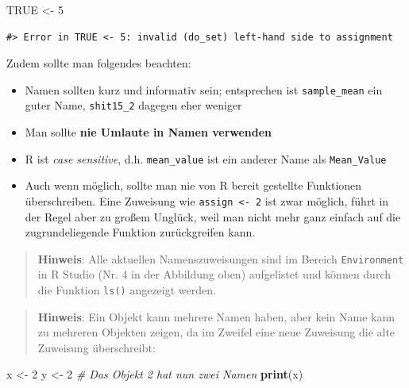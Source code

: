 \documentclass[]{tufte-book}
\newenvironment{Shaded}{}{}
\newcommand{\KeywordTok}[1]{\textcolor[rgb]{0.00,0.44,0.13}{\textbf{#1}}}
\newcommand{\DecValTok}[1]{\textcolor[rgb]{0.25,0.63,0.44}{#1}}
\newcommand{\StringTok}[1]{\textcolor[rgb]{0.25,0.44,0.63}{#1}}
\newcommand{\CommentTok}[1]{\textcolor[rgb]{0.38,0.63,0.69}{\textit{#1}}}
\newcommand{\OtherTok}[1]{\textcolor[rgb]{0.00,0.44,0.13}{#1}}
\newcommand{\NormalTok}[1]{#1}
\providecommand{\tightlist}{%
  \setlength{\itemsep}{0pt}\setlength{\parskip}{0pt}}
\begin{document}
\begin{Shaded}
\begin{Highlighting}[]
\OtherTok{TRUE}\NormalTok{ <-}\StringTok{ }\DecValTok{5}
\end{Highlighting}
\end{Shaded}

\begin{verbatim}
#> Error in TRUE <- 5: invalid (do_set) left-hand side to assignment
\end{verbatim}

Zudem sollte man folgendes beachten:

\begin{itemize}
\tightlist
\item
  Namen sollten kurz und informativ sein; entsprechen ist
  \texttt{sample\_mean} ein guter Name, \texttt{shit15\_2} dagegen eher
  weniger
\item
  Man sollte \textbf{nie Umlaute in Namen verwenden}
\item
  R ist \emph{case sensitive}, d.h. \texttt{mean\_value} ist ein anderer
  Name als \texttt{Mean\_Value}
\item
  Auch wenn möglich, sollte man nie von R bereit gestellte Funktionen
  überschreiben. Eine Zuweisung wie \texttt{assign\ \textless{}-\ 2} ist
  zwar möglich, führt in der Regel aber zu großem Unglück, weil man
  nicht mehr ganz einfach auf die zugrundeliegende Funktion
  zurückgreifen kann.
\end{itemize}

\begin{quote}
\textbf{Hinweis}: Alle aktuellen Namenszuweisungen sind im Bereich
\texttt{Environment} in R Studio (Nr. 4 in der Abbildung oben)
aufgelistet und können durch die Funktion \texttt{ls()} angezeigt
werden.
\end{quote}

\begin{quote}
\textbf{Hinweis}: Ein Objekt kann mehrere Namen haben, aber kein Name
kann zu mehreren Objekten zeigen, da im Zweifel eine neue Zuweisung die
alte Zuweisung überschreibt:
\end{quote}

\begin{Shaded}
\begin{Highlighting}[]
\NormalTok{x <-}\StringTok{ }\DecValTok{2}
\NormalTok{y <-}\StringTok{ }\DecValTok{2}  \CommentTok{# Das Objekt 2 hat nun zwei Namen}
\KeywordTok{print}\NormalTok{(x)}
\end{Highlighting}
\end{Shaded}
\end{document}
